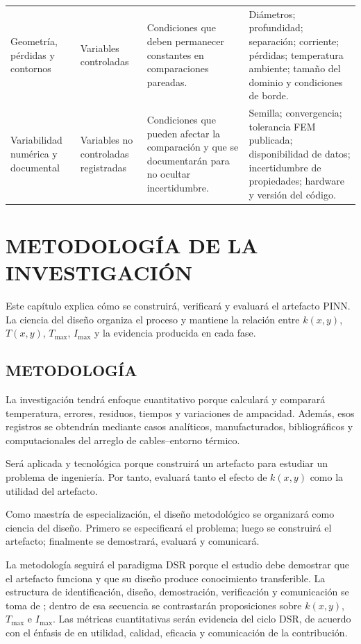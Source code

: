 \documentclass[11pt,a4paper,oneside]{report}
\newcommand{\Tmax}{T_{\max}}
\newcommand{\Imax}{I_{\max}}
\newcommand{\kx}{k(x,y)}
\begin{document}
\begin{table}[H]
\begin{tabularx}{\textwidth}{L{3.0cm}L{2.75cm}Y Y}
Geometría, pérdidas y contornos & Variables controladas & Condiciones que deben permanecer constantes en comparaciones pareadas. & Diámetros; profundidad; separación; corriente; pérdidas; temperatura ambiente; tamaño del dominio y condiciones de borde. \\
Variabilidad numérica y documental & Variables no controladas registradas & Condiciones que pueden afectar la comparación y que se documentarán para no ocultar incertidumbre. & Semilla; convergencia; tolerancia FEM publicada; disponibilidad de datos; incertidumbre de propiedades; hardware y versión del código. \\
\bottomrule
\end{tabularx}
\endgroup
\end{table}


\chapter{METODOLOGÍA DE LA INVESTIGACIÓN}
\label{ch:metodologia}
\thispagestyle{empty}

Este capítulo explica cómo se construirá, verificará y evaluará el artefacto PINN. La ciencia del diseño organiza el proceso y mantiene la relación entre $\kx$, $T(x,y)$, $\Tmax$, $\Imax$ y la evidencia producida en cada fase.

\section{METODOLOGÍA}
\label{sec:metodologia}

La investigación tendrá enfoque cuantitativo porque calculará y comparará temperatura, errores, residuos, tiempos y variaciones de ampacidad. Además, esos registros se obtendrán mediante casos analíticos, manufacturados, bibliográficos y computacionales del arreglo de cables--entorno térmico.

Será aplicada y tecnológica porque construirá un artefacto para estudiar un problema de ingeniería. Por tanto, evaluará tanto el efecto de $\kx$ como la utilidad del artefacto.

Como maestría de especialización, el diseño metodológico se organizará como ciencia del diseño. Primero se especificará el problema; luego se construirá el artefacto; finalmente se demostrará, evaluará y comunicará.

La metodología seguirá el paradigma DSR porque el estudio debe demostrar que el artefacto funciona y que su diseño produce conocimiento transferible. La estructura de identificación, diseño, demostración, verificación y comunicación se toma de \textcite[55--56]{peffers2007}; dentro de esa secuencia se contrastarán proposiciones sobre $\kx$, $\Tmax$ e $\Imax$. Las métricas cuantitativas serán evidencia del ciclo DSR, de acuerdo con el énfasis de \textcite[349--351]{gregor2013} en utilidad, calidad, eficacia y comunicación de la contribución. 
\end{document}
